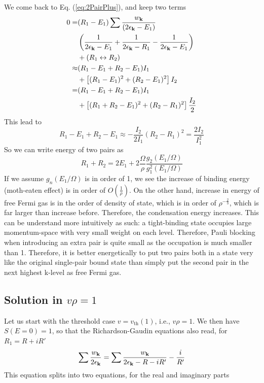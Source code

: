 \documentclass[aps,prb,showpacs,reprint]{revtex4-1}
\begin{document}
We come back to Eq. (\ref{eq:2PairPlus}), and keep two terms
\begin{equation}
\begin{split}
0=&(R_1-E_1)\sum{\frac{w_{\ensuremath{\mathbf{k}}}}{(2\epsilon_{\ensuremath{\mathbf{k}}}-E_1)}}\\
&\left(\frac{1}{2\epsilon_{\mathbf{k}}-E_1}+\frac{1}{2\epsilon_{\mathbf{k}}-R_1}-\frac{1}{2\epsilon_{\mathbf{k}}-E_1}\right)\\
&+(R_1\leftrightarrow{}R_2)\\
\approx&(R_1-E_1+R_2-E_1)I_1\\
&+\left[(R_1-E_1)^2+(R_2-E_1)^2\right]I_2\\
=&(R_1-E_1+R_2-E_1)I_1\\
&+\left[(R_1+R_2-E_1)^2+(R_2-R_1)^2\right]\frac{I_2}{2}
\end{split}
\label{eq:}
\end{equation}
This lead to 
\begin{equation}
R_1-E_1+R_2-E_1\approx-\frac{I_2}{2I_1}(R_2-R_1)^2=\frac{2I_2}{I_1^2}
\label{eq:}
\end{equation}
So we can write energy of two pairs as
\begin{equation}
R_1+R_2=2E_1+2\frac{\Omega}{\rho}\frac{g_2(E_1/\Omega)}{g_1^2(E_1/\Omega)}
\label{eq:}
\end{equation}
If we assume $g_n(E_1/\Omega)$ is in order of 1, we see the increase of binding energy (moth-eaten effect) is in order of $O(\frac{1}{\rho})$.  On the other hand, increase in energy of free Fermi gas is in the order of density of state, which is in order of $\rho^{-\frac{2}{3}}$, which is far larger than increase before.  Therefore, the condensation energy increases. This can be understand more intuitively as such: a tight-binding state occupies large momentum-space with very small weight on each level. Therefore, Pauli blocking when introducing an extra pair is quite small as the occupation is much smaller than 1. Therefore, it is better energetically to put two pairs both in a state very like the original single-pair bound state than simply put the second pair in the next highest k-level as free Fermi gas.   
\subsection{Solution in $v\rho=1$}
Let us start with the threshold case $v=v_{\text{th}}(1)$, i.e., $v\rho=1$.  We then have $S(E=0)=1$, so that the Richardson-Gaudin equations also read, for $R_1=R+iR'$
\begin{equation}
\sum\frac{w_{\mathbf{k}}}{2\epsilon_{\mathbf{k}}}=\sum\frac{w_{\mathbf{k}}}{2\epsilon_{\mathbf{k}}-R-iR'}-\frac{i}{R'}
\label{eq:}
\end{equation}
This equation splits into two equations, for the real and imaginary parts
\end{document}
